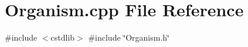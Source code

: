 \section{Organism.\+cpp File Reference}
\label{Organism_8cpp}
{\ttfamily \#include $<$cstdlib$>$}\newline
{\ttfamily \#include \char`\"{}Organism.\+h\char`\"{}}\newline
